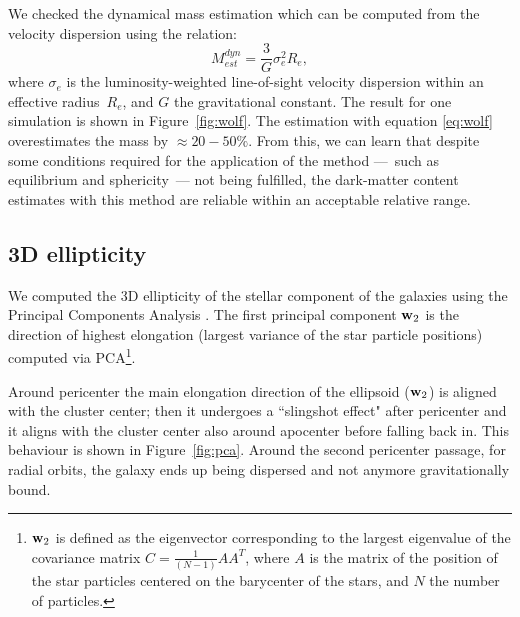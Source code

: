 We checked the dynamical mass estimation which can be computed from the velocity dispersion using the \citet{Wolf2010} relation:
\begin{equation}
\label{eq:wolf}
M^{dyn}_{est} = \dfrac{3}{G} \sigma_e^2 R_e,
\end{equation}
where $\sigma_e$ is the luminosity-weighted line-of-sight velocity dispersion within an effective radius~$R_e$,
and $G$ the gravitational constant.
The result for one simulation is shown in Figure~\ref{fig:wolf}.
The estimation with equation \eqref{eq:wolf} overestimates the mass by $\approx20-50\%$.
From this, we can learn that despite some conditions required for the application of the method ---~such as equilibrium and sphericity~--- not being fulfilled, the dark-matter content estimates with this method are reliable within an acceptable relative range.



\subsection{3D ellipticity}
We computed the 3D ellipticity of the stellar component of the galaxies using the Principal Components Analysis \citep[PCA, ][]{Pearson1901}.
The first principal component $\boldsymbol{\mathbf{w}}_2$ is the direction of highest elongation (largest variance of the star particle positions) computed via PCA\footnote{
$\boldsymbol{\mathbf{w}}_2$ is defined as the eigenvector corresponding to the largest eigenvalue of the covariance matrix $C = \frac 1 {(N-1)} AA^T$, where $A$ is the matrix of the position of the star particles centered on the barycenter of the stars, and $N$ the number of particles.}.

Around pericenter the main elongation direction of the ellipsoid ($\boldsymbol{\mathbf{w}}_2$) is aligned with the cluster center; then it undergoes a ``slingshot effect" after pericenter and it aligns with the cluster center also around apocenter before falling back in. This behaviour is shown in Figure~\ref{fig:pca}.
Around the second pericenter passage, for radial orbits, the galaxy ends up being dispersed and not anymore gravitationally bound.

